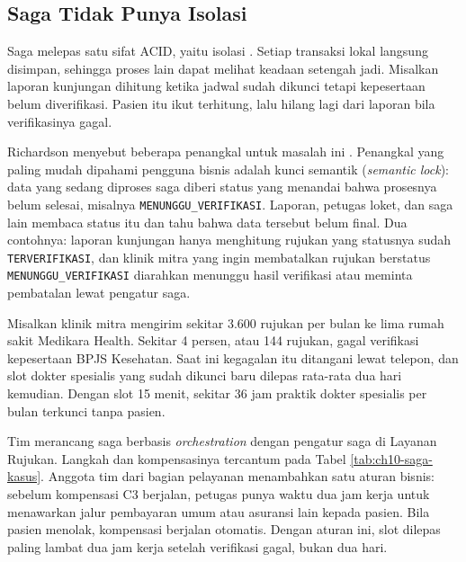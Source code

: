\subsection{Saga Tidak Punya Isolasi}

Saga melepas satu sifat ACID, yaitu isolasi \cite{c10-richardson-saga}. Setiap transaksi lokal
langsung disimpan, sehingga proses lain dapat melihat keadaan setengah jadi. Misalkan laporan
kunjungan dihitung ketika jadwal sudah dikunci tetapi kepesertaan belum diverifikasi. Pasien itu
ikut terhitung, lalu hilang lagi dari laporan bila verifikasinya gagal.

Richardson menyebut beberapa penangkal untuk masalah ini \cite{richardson2018}. Penangkal yang
paling mudah dipahami pengguna bisnis adalah kunci semantik (\textit{semantic lock}): data yang
sedang diproses saga diberi status yang menandai bahwa prosesnya belum selesai, misalnya
\texttt{MENUNGGU\_VERIFIKASI}. Laporan, petugas loket, dan saga lain membaca status itu dan tahu
bahwa data tersebut belum final. Dua contohnya: laporan kunjungan hanya menghitung rujukan yang
statusnya sudah \texttt{TERVERIFIKASI}, dan klinik mitra yang ingin membatalkan rujukan berstatus
\texttt{MENUNGGU\_VERIFIKASI} diarahkan menunggu hasil verifikasi atau meminta pembatalan lewat
pengatur saga.

\begin{kasus}[title={Kasus Medikara Health: Saga Pendaftaran Pasien Rujukan}]
  Misalkan klinik mitra mengirim sekitar 3.600 rujukan per bulan ke lima rumah sakit Medikara
  Health. Sekitar 4 persen, atau 144 rujukan, gagal verifikasi kepesertaan BPJS Kesehatan. Saat ini
  kegagalan itu ditangani lewat telepon, dan slot dokter spesialis yang sudah dikunci baru dilepas
  rata-rata dua hari kemudian. Dengan slot 15 menit, sekitar 36 jam praktik dokter spesialis per
  bulan terkunci tanpa pasien.

  Tim merancang saga berbasis \textit{orchestration} dengan pengatur saga di Layanan Rujukan.
  Langkah dan kompensasinya tercantum pada Tabel \ref{tab:ch10-saga-kasus}. Anggota tim dari bagian
  pelayanan menambahkan satu aturan bisnis: sebelum kompensasi C3 berjalan, petugas punya waktu dua
  jam kerja untuk menawarkan jalur pembayaran umum atau asuransi lain kepada pasien. Bila pasien
  menolak, kompensasi berjalan otomatis. Dengan aturan ini, slot dilepas paling lambat dua jam kerja
  setelah verifikasi gagal, bukan dua hari.
\end{kasus}

